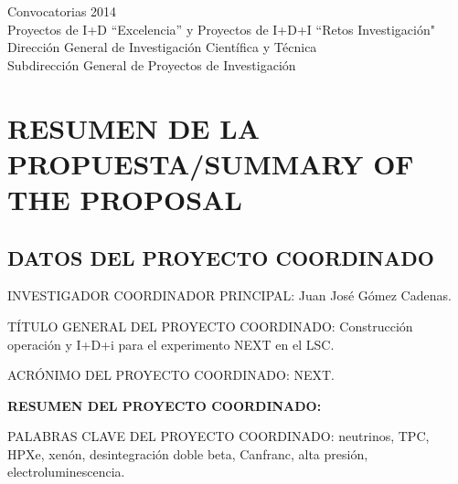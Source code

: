 \documentclass[a4paper,11pt,oneside]{article}
\begin{document}


\begin{center}
{\Large \textsf{Convocatorias 2014}} \\ \vspace{0.3cm}
{\Large  \textsf{Proyectos de I+D ``Excelencia'' y Proyectos de I+D+I ``Retos Investigación"}} \\ 
{\Large \textsf{Dirección General de Investigación Científica y Técnica}} \\
{\Large \textsf{Subdirección General de Proyectos de Investigación }} \\ 
\end{center}


\section{\bf \textsf{RESUMEN DE LA PROPUESTA/SUMMARY OF THE PROPOSAL}}
\subsection{\sc DATOS DEL PROYECTO COORDINADO}

{\sc INVESTIGADOR COORDINADOR PRINCIPAL:} Juan José Gómez Cadenas.
\vspace{0.3cm}

{\sc TÍTULO GENERAL DEL PROYECTO COORDINADO:} Construcción operación y I+D+i para el experimento NEXT en el LSC.
\vspace{0.3cm}

{\sc ACRÓNIMO DEL PROYECTO COORDINADO:} NEXT.
\vspace{0.3cm}

{\bf RESUMEN DEL PROYECTO COORDINADO:} 
\vspace{0.3cm}

 
 \vspace{0.3cm}

{\sc PALABRAS CLAVE DEL PROYECTO COORDINADO:} neutrinos, TPC, HPXe, xenón, desintegración doble beta, Canfranc, alta presión, electroluminescencia. 
\end{document}
